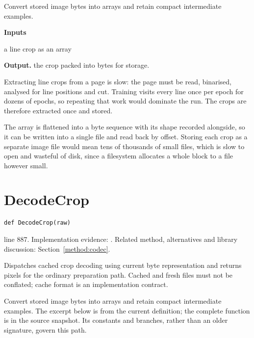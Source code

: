 Convert stored image bytes into arrays and retain compact intermediate examples.




\noindent\textbf{Inputs}
\begin{description}[leftmargin=2.2em,style=nextline,font=\normalfont\ttfamily]\setlength\itemsep{1pt}
  \item[{arr}] \normalfont a line crop as an array
\end{description}

\noindent\textbf{Output.} the crop packed into bytes for storage.


Extracting line crops from a page is slow: the page must be read, binarised, analysed for line positions and cut. Training visits every line once per epoch for dozens of epochs, so repeating that work would dominate the run. The crops are therefore extracted once and stored.


The array is flattened into a byte sequence with its shape recorded alongside, so it can be written into a single file and read back by offset. Storing each crop as a separate image file would mean tens of thousands of small files, which is slow to open and wasteful of disk, since a filesystem allocates a whole block to a file however small.



\section{DecodeCrop}\label{fn:train:DecodeCrop}
\begin{lstlisting}[style=sig]
def DecodeCrop(raw)
\end{lstlisting}
 line 887. Implementation evidence: \cite{code2026}. Related method, alternatives and library discussion: Section~\ref{method:codec}.


Dispatches cached crop decoding using current byte representation and returns pixels for the ordinary preparation path. Cached and fresh files must not be conflated; cache format is an implementation contract.


Convert stored image bytes into arrays and retain compact intermediate examples. The excerpt below is from the current definition; the complete function is in the source snapshot. Its constants and branches, rather than an older signature, govern this path.


